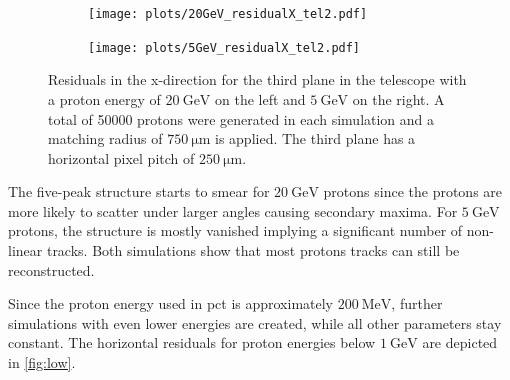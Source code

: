 \begin{figure}
  \hspace{-2.5cm}
  \begin{subfigure}{0.62\textwidth}
      \centering
      \texttt{[image: plots/20GeV\_residualX\_tel2.pdf]}
  \end{subfigure}
  \begin{subfigure}{0.62\textwidth}
      \hspace{0.95cm}
      \texttt{[image: plots/5GeV\_residualX\_tel2.pdf]}
  \end{subfigure}
  \caption{Residuals in the x-direction for the third plane in the telescope with a proton energy of $\SI{20}{\giga\eV}$ on the left
  and $\SI{5}{\GeV}$ on the right. A total of 50000 protons were generated in each simulation and a matching radius of $\SI{750}{\micro\meter}$ is applied. The third plane has
  a horizontal pixel pitch of $\SI{250}{\micro\meter}$.}
  \label{fig:20GeV}
\end{figure}

The five-peak structure starts to smear for $\SI{20}{\giga\eV}$ protons since the protons are more likely to scatter under larger angles causing secondary maxima.
For $\SI{5}{\GeV}$ protons, the structure is mostly vanished implying a significant number of non-linear tracks. Both simulations show that most
protons tracks can still be reconstructed.

Since the proton energy used in pct is approximately $\SI{200}{\mega\eV}$, further simulations with even lower energies are created, while all other parameters stay constant.
The horizontal residuals for proton energies below $\SI{1}{\giga\eV}$ are depicted in \ref{fig:low}.

